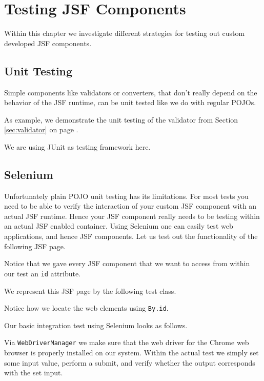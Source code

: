 %

\chapter{Testing JSF Components}
Within this chapter we investigate different strategies for testing out custom developed JSF components.

\section{Unit Testing}
Simple components like validators or converters, that don't really depend on the behavior of the JSF runtime, can be unit tested like we do with regular POJOs.

As example, we demonstrate the unit testing of the validator from Section \ref{sec:validator}  on page \pageref{sec:validator}.

We are using JUnit \cite{junit5} as testing framework here.


\section{Selenium}
Unfortunately plain POJO unit testing has its limitations.
For most tests you  need to be able to verify the interaction of your custom JSF component with an actual JSF runtime.
Hence your JSF component really needs to be testing within an actual JSF enabled container.
Using Selenium \cite{selenium} one can easily test web applications, and hence JSF components.
Let us test out the functionality of the following JSF page.

Notice that we gave every JSF component that we want to access from within our test an \texttt{id} attribute.

We represent this JSF page by the following test class.

Notice how we locate the web elements using \texttt{By.id}.

Our basic integration test using Selenium looks as follows.

Via \texttt{WebDriverManager} we make sure that the web driver \cite{webdriver} for the Chrome web browser is properly installed on our system.
Within the actual test we simply set some input value, perform a submit, and verify whether the output corresponds with the set input.

